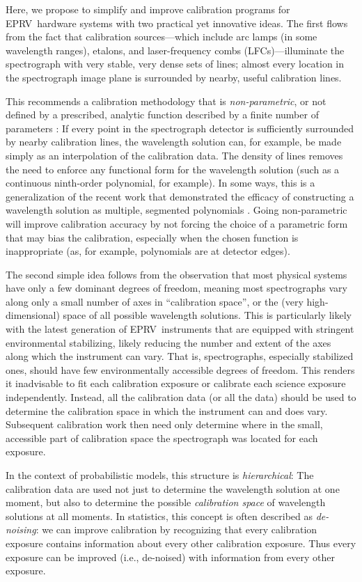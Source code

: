 \documentclass[modern]{aastex63}
\newcommand{\acronym}[1]{{\small{#1}}}
\newcommand{\eprv}{\acronym{EPRV}}
\newcommand{\lfc}{\acronym{LFC}}
\begin{document}
Here, we propose to simplify and improve calibration programs for \eprv\ hardware systems with two practical yet innovative ideas.  The first flows from the fact that calibration sources---which include arc lamps (in some wavelength ranges), etalons, and laser-frequency combs (\lfc s)---illuminate the spectrograph with very stable, very dense sets of lines; almost every location in the spectrograph image plane is surrounded by nearby, useful calibration lines.

This recommends a calibration methodology that is \emph{non-parametric}, or not defined by a prescribed, analytic function described by a finite number of parameters :  If every point in the spectrograph detector is sufficiently surrounded by nearby calibration lines, the wavelength solution can, for example, be made simply as an interpolation of the calibration data.  The density of lines removes the need to enforce any functional form for the wavelength solution (such as a continuous ninth-order polynomial, for example).  In some ways, this is a generalization of the recent work that demonstrated the efficacy of constructing a wavelength solution as multiple, segmented polynomials \citep{milakovic2020}.  Going non-parametric will improve calibration accuracy by not forcing the choice of a parametric form that may bias the calibration, especially when the chosen function is inappropriate (as, for example, polynomials are at detector edges).

The second simple idea follows from the observation that most physical systems have only a few dominant degrees of freedom, meaning most spectrographs vary along only a small number of axes in ``calibration space'', or the (very high-dimensional) space of all possible wavelength solutions.  This is particularly likely with the latest generation of \eprv\ instruments that are equipped with stringent environmental stabilizing, likely reducing the number and extent of the axes along which the instrument can vary.  That is, spectrographs, especially stabilized ones, should have few environmentally accessible degrees of freedom.  This renders it inadvisable to fit each calibration exposure or calibrate each science exposure independently.  Instead, all the calibration data (or all the data) should be used to determine the calibration space in which the instrument can and does vary.  Subsequent calibration work then need only determine where in the small, accessible part of calibration space the spectrograph was located for each exposure.

In the context of probabilistic models, this structure is \emph{hierarchical}:  The calibration data are used not just to determine the wavelength solution at one moment, but also to determine the possible \emph{calibration space} of wavelength solutions at all moments.  In statistics, this concept is often described as \emph{de-noising}:  we can improve calibration by recognizing that every calibration exposure contains information about every other calibration exposure.  Thus every exposure can be improved (i.e., de-noised) with information from every other exposure.
\end{document}
